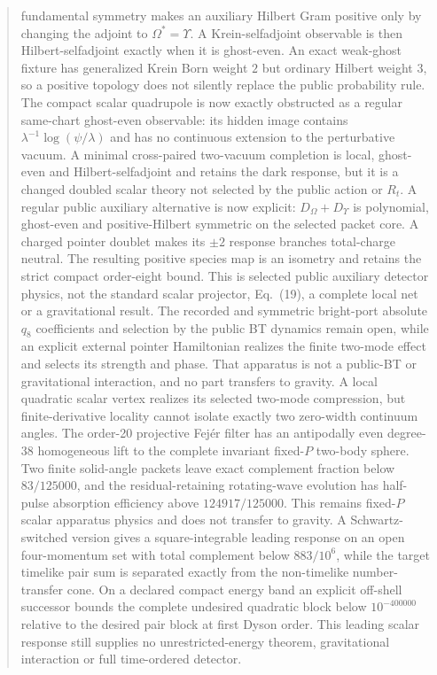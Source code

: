 \documentclass[11pt]{article}
\theoremstyle{definition}
\theoremstyle{remark}
\begin{document}
\begin{abstract}
fundamental symmetry makes an auxiliary Hilbert Gram positive only by
changing the adjoint to $\Omega^*=\Upsilon$.  A Krein-selfadjoint observable
is then Hilbert-selfadjoint exactly when it is ghost-even.  An exact
weak-ghost fixture has generalized Krein Born weight $2$ but ordinary
Hilbert weight $3$, so a positive topology does not silently replace the
public probability rule.  The compact scalar quadrupole is now exactly
obstructed as a regular same-chart ghost-even observable: its hidden image
contains $\lambda^{-1}\log(\psi/\lambda)$ and has no continuous extension to
the perturbative vacuum.  A minimal cross-paired two-vacuum completion is
local, ghost-even and Hilbert-selfadjoint and retains the dark response, but
it is a changed doubled scalar theory not selected by the public action or
$R_t$.
A regular public auxiliary alternative is now explicit:
$D_\Omega+D_\Upsilon$ is polynomial, ghost-even and positive-Hilbert
symmetric on the selected packet core.  A charged pointer doublet makes its
$\pm2$ response branches total-charge neutral.  The resulting positive
species map is an isometry and retains the strict compact order-eight bound.
This is selected public auxiliary detector physics, not the standard scalar
projector, Eq.~(19), a complete local net or a gravitational result.
The recorded and symmetric bright-port absolute
$q_8$ coefficients and selection by the public BT dynamics remain open,
while an explicit external pointer Hamiltonian realizes the finite
two-mode effect and selects its strength and phase.  That apparatus is not a
public-BT or gravitational interaction, and no part transfers to gravity.  A
local quadratic scalar vertex realizes its selected two-mode compression, but
finite-derivative locality cannot isolate exactly two zero-width continuum
angles.  The order-20 projective Fej\'er filter has an antipodally even
degree-38 homogeneous lift to the complete invariant fixed-$P$ two-body
sphere.  Two finite solid-angle packets leave exact complement fraction below
$83/125000$, and the residual-retaining rotating-wave evolution has half-pulse
absorption efficiency above $124917/125000$.  This remains fixed-$P$ scalar
apparatus physics and does not transfer to gravity.  A Schwartz-switched
version gives a square-integrable leading response on an open four-momentum
set with total complement below $883/10^6$, while the target timelike pair
sum is separated exactly from the non-timelike number-transfer cone.  On a
declared compact energy band an explicit off-shell successor bounds the
complete undesired quadratic block below $10^{-400000}$ relative to the
desired pair block at first Dyson order.  This leading scalar response still
supplies no unrestricted-energy theorem, gravitational interaction or full
time-ordered detector.
\end{abstract}
\end{document}
